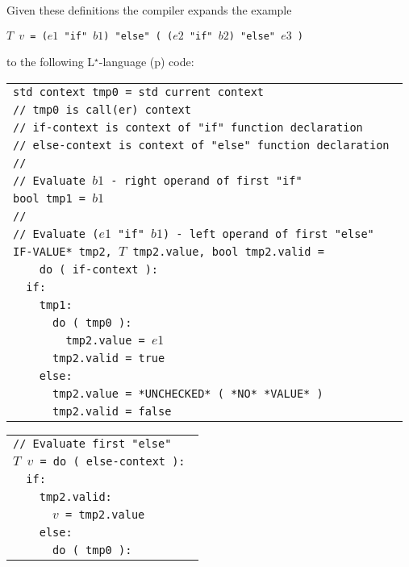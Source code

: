 \documentclass[12pt]{article}
\newcommand{\LSTAR}{L$^\star$}
\newcommand{\pagref}[1]{p\pageref{#1}}
\newenvironment{indpar}[1][0.3in]%
	{\begin{list}{}%
		     {\setlength{\itemsep}{0in}%
		      \setlength{\topsep}{0in}%
		      \setlength{\parsep}{1ex}%
		      \setlength{\labelwidth}{#1}%
		      \setlength{\leftmargin}{#1}%
		      \addtolength{\leftmargin}{\labelsep}}%
	 \item}%
	{\end{list}}
\begin{document}
Given these definitions the compiler expands the example
\begin{center}\label{IF-ELSE-EXAMPLE}
\tt $T$ $v$ = ($e1$ "if" $b1$) "else" ( ($e2$ "if" $b2$) "else" $e3$ )
\end{center}

to the following \LSTAR-language (\pagref{LSTAR-LANGUAGE}) code:

\begin{indpar}
\begin{tabular}{l}
\tt std context tmp0 = std current context \\
\tt // tmp0 is call(er) context \\
\tt // if-context is context of "if" function declaration \\
\tt // else-context is context of "else" function declaration \\
\tt // \\
\tt // Evaluate $b1$ - right operand of first "if"\\
\tt bool tmp1 = $b1$ \\
\tt // \\
\tt // Evaluate ($e1$ "if" $b1$) - left operand of first "else" \\
\tt *IF-VALUE* tmp2, $T$ tmp2.value, bool tmp2.valid = \\
\tt ~~~~do ( if-context ): \\
\tt ~~if: \\
\tt ~~~~tmp1: \\
\tt ~~~~~~do ( tmp0 ): \\
\tt ~~~~~~~~tmp2.value = $e1$ \\
\tt ~~~~~~tmp2.valid = true \\
\tt ~~~~else: \\
\tt ~~~~~~tmp2.value = *UNCHECKED* ( *NO* *VALUE* ) \\
\tt ~~~~~~tmp2.valid = false \\
\end{tabular}

\begin{tabular}{l}
\tt // Evaluate first "else" \\
\tt $T$ $v$ = do ( else-context ): \\
\tt ~~if: \\
\tt ~~~~tmp2.valid: \\
\tt ~~~~~~$v$ = tmp2.value \\
\tt ~~~~else: \\
\tt ~~~~~~do ( tmp0 ): \\
\end{tabular}


\end{indpar}
\end{document}
